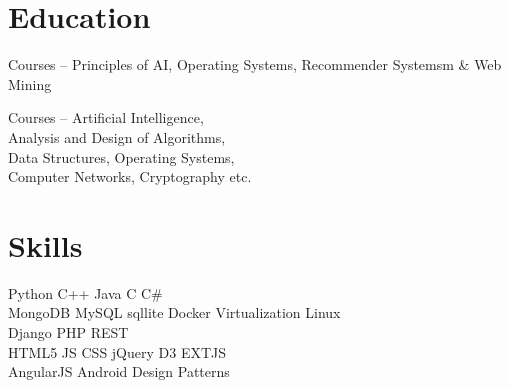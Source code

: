 \documentclass[]{deedy-resume-openfont}
\begin{document}
    
%
%
\lastupdated
    
%
%
    
    
    
%
%
    
\begin{minipage}[t]{0.33\textwidth} 
	    
	    
	\section{Education} 
	    
	Courses – Principles of AI, Operating Systems, Recommender Systemsm \& Web Mining
	\sectionsep
	    
	Courses – Artificial Intelligence, \\Analysis and Design of Algorithms, \\Data Structures, Operating Systems, \\Computer Networks, Cryptography etc.
	\sectionsep
	    
	    
	    
	\section{Skills}
	Python \textbullet{}   C++ \textbullet{} Java \textbullet{} C \textbullet{} C\# \\
	MongoDB \textbullet{} MySQL \textbullet{} sqllite 
	Docker \textbullet{} Virtualization \textbullet{} Linux \\
	Django \textbullet{} PHP \textbullet{} REST \\
	HTML5 \textbullet{} JS \textbullet{} CSS \textbullet{} jQuery \textbullet{} D3 \textbullet{} EXTJS\\
	AngularJS \textbullet{}  Android \textbullet{} Design Patterns
	\sectionsep
	    

\end{minipage}
\end{document}
